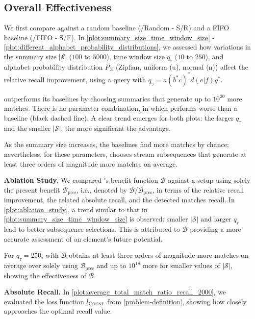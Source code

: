 \subsection{Overall Effectiveness}
\label{subsec:overall-effectiveness}
We first compare against a random baseline (\suse{}/Random - S/R) and a FIFO
baseline (\suse{}/FIFO - S/F). In
\autoref{plot:summary_size_time_window_size} - \ref{plot:different_alphabet_probability_distributions}, we assessed how
variations in the summary size $|\mathcal{S}|$ ($100$ to $5000$),
time window size $q_\tau$ ($10$ to $250$), and
alphabet probability distribution $P_\Sigma$ (Zipfian, uniform (u), normal (n)) affect
the relative recall improvement, using a query with $q_\gamma = a(b^*c)^*d(e|f)g^*$.

\suse{} outperforms its baselines by choosing summaries that generate
up to $10^{20}$ more matches. There is no parameter combination, in which
\suse{}
performs worse than a baseline (black dashed line). A clear
trend emerges for both plots: the larger $q_\tau$ and the smaller
$|\mathcal{S}|$, the more significant the advantage.

As the summary size increases, the baselines find more matches by chance; nevertheless, for these parameters, \suse{} chooses stream subsequences that generate at least three orders of magnitude more matches on average.

\textbf{Ablation Study.} We compared \suse{}'s benefit function $\mathcal{B}$ against
a setup using solely the present benefit $\mathcal{B}_{\text{pres}}$, i.e.,
{denoted by $\mathcal{B}$/$\mathcal{B}_{\text{pres}}$}, in terms
of the relative recall improvement, the related absolute recall, and the detected
matches recall. %
In \autoref{plot:ablation_study}, a trend similar to that in
\autoref{plot:summary_size_time_window_size} is observed: smaller
$|\mathcal{S}|$ and larger $q_\tau$ lead to better subsequence selections. This
is attributed to $\mathcal{B}$ providing a more accurate assessment of an element's future potential.

For $q_\tau = 250$, \suse{} with $\mathcal{B}$ obtains at least three orders of
magnitude more matches on average over solely using
$\mathcal{B}_{\text{pres}}$ and up to $10^{18}$ more for smaller values of
$|\mathcal{S}|$, showing the effectiveness of $\mathcal{B}$.

\textbf{Absolute Recall.} In \autoref{plot:average_total_match_ratio_recall_2000}, we evaluated the loss function $l_{\textsc{Count}}$ from \autoref{problem-definition}, showing how closely \suse{} approaches the optimal recall value.

